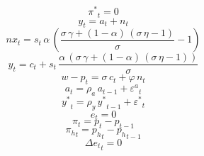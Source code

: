 \begin{dmath}
{{\pi^{*}}}_{t}=0
\end{dmath}
\begin{dmath}
{y}_{t}={a}_{t}+{{n}}_{t}
\end{dmath}
\begin{dmath}
{{nx}}_{t}={s}_{t}\, {\alpha}\, \left(\frac{{\sigma}\, {\gamma}+\left(1-{\alpha}\right)\, \left({\sigma}\, {\eta}-1\right)}{{\sigma}}-1\right)
\end{dmath}
\begin{dmath}
{y}_{t}={c}_{t}+{s}_{t}\, \frac{{\alpha}\, \left({\sigma}\, {\gamma}+\left(1-{\alpha}\right)\, \left({\sigma}\, {\eta}-1\right)\right)}{{\sigma}}
\end{dmath}
\begin{dmath}
{{w-p}}_{t}={\sigma}\, {c}_{t}+{\varphi}\, {{n}}_{t}
\end{dmath}
\begin{dmath}
{a}_{t}={\rho_a}\, {a}_{t-1}+{{\varepsilon^{a}}}_{t}
\end{dmath}
\begin{dmath}
{{y^*}}_{t}={\rho_y}\, {{y^*}}_{t-1}+{{\varepsilon^{*}}}_{t}
\end{dmath}
\begin{dmath}
{e}_{t}=0
\end{dmath}
\begin{dmath}
{{\pi}}_{t}={p}_{t}-{p}_{t-1}
\end{dmath}
\begin{dmath}
{{\pi_h}}_{t}={{p_h}}_{t}-{{p_h}}_{t-1}
\end{dmath}
\begin{dmath}
{\Delta e_t}_{t}=0
\end{dmath}
